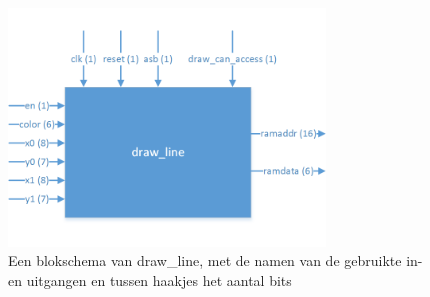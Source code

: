 \documentclass{scrartcl} %
\begin{document}
\begin{figure}[H]
	\centering
	\includegraphics[width=0.75\textwidth]{resource/draw_line.png}
	\caption{Een blokschema van draw\_line, met de namen van de gebruikte in- en uitgangen en tussen haakjes het aantal bits}
	\label{fig:draw-line-schema}
\end{figure}
\end{document}
